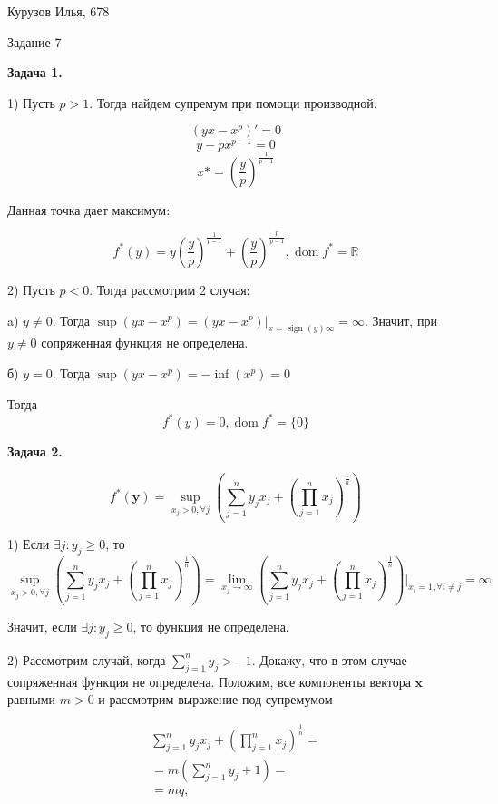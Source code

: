 \documentclass[12pt]{article}
\DeclareMathOperator*{\sign}{sign}
\DeclareMathOperator*{\dom}{dom}
\begin{document}
\begin{center}
	{Курузов Илья, 678}

	{Задание 7}
\end{center}

\begin{center}
	\textbf{Задача 1.}
\end{center}

1) Пусть $p>1$. Тогда найдем супремум при помощи производной.

$$(yx - x^p)'=0$$
$$y - px^{p-1}=0$$
$$x* = \left(\frac{y}{p}\right)^{\frac{1}{p-1}}$$

Данная точка дает максимум:

$$f^*(y)=y\left(\frac{y}{p}\right)^{\frac{1}{p-1}} + \left(\frac{y}{p}\right)^{\frac{p}{p-1}}, \dom f^* = \mathbb{R}$$

2) Пусть $p<0$. Тогда рассмотрим 2 случая:

a) $y\neq 0$. Тогда $\sup (yx - x^p) = (yx - x^p)|_{x = \sign(y) \infty} = \infty$. Значит, при $y \neq 0$ сопряженная функция не определена.

б) $y = 0$. Тогда $\sup(yx-x^p) = -\inf(x^p) = 0$

Тогда 
$$\boxed{f^*(y) = 0, \dom f^* = \{0\}}$$

\begin{center}
	\textbf{Задача 2.}
\end{center}

$$f^*(\textbf{y}) = \sup\limits_{x_j> 0,\forall j}\left(\sum\limits_{j=1}^n y_jx_j + \left(\prod\limits_{j=1}^nx_j\right)^{\frac{1}{n}}\right)$$

1) Если $\exists j:y_j\geq 0$, то 
$$\sup\limits_{x_j> 0,\forall j}\left(\sum\limits_{j=1}^n y_jx_j + \left(\prod\limits_{j=1}^nx_j\right)^{\frac{1}{n}}\right) = \lim\limits_{x_j\to \infty}\left(\sum\limits_{j=1}^n y_jx_j + \left(\prod\limits_{j=1}^nx_j\right)^{\frac{1}{n}}\right)\Big|_{x_i = 1,\forall i \neq j} = \infty$$

Значит, если $\exists j:y_j\geq 0$, то функция не определена.

2) Рассмотрим случай, когда $\sum\limits_{j=1}^n y_j > -1$. Докажу, что в этом случае сопряженная функция не определена. Положим, все компоненты вектора $\textbf{x}$ равными $m>0$ и рассмотрим выражение под супремумом

\begin{eqnarray}
\sum\limits_{j=1}^n y_jx_j + \left(\prod\limits_{j=1}^nx_j\right)^{\frac{1}{n}} = \\
= m\left(\sum\limits_{j=1}^n y_j + 1\right) = \\
= mq,
\end{eqnarray}
\end{document}

